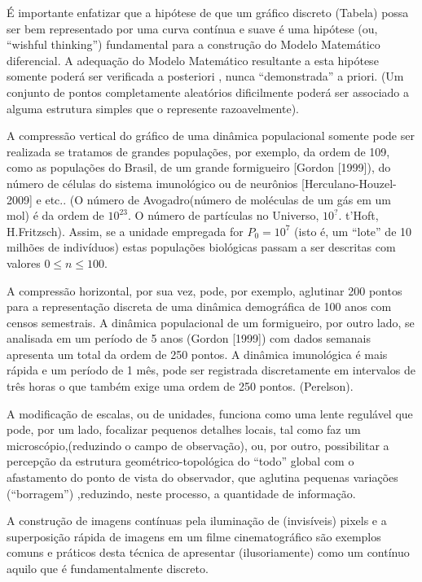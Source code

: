     É importante enfatizar que a hipótese de que um gráfico discreto (Tabela) possa ser bem representado por uma curva contínua e suave é uma hipótese (ou, ``wishful thinking'') fundamental para a construção do Modelo Matemático diferencial. A adequação do Modelo Matemático resultante a esta hipótese somente poderá ser verificada a posteriori , nunca ``demonstrada'' a priori. (Um conjunto de pontos completamente aleatórios dificilmente poderá ser associado a alguma estrutura simples que o represente razoavelmente).

    A compressão vertical do gráfico de uma dinâmica populacional somente pode ser realizada se tratamos de grandes populações, por exemplo, da ordem de 109, como as populações do Brasil, de um grande formigueiro [Gordon [1999]), do número de células do sistema imunológico ou de neurônios [Herculano-Houzel-2009] e etc.. (O número de Avogadro(número de moléculas de um gás em um mol) é da ordem de \(10^{23}\). O número de partículas no Universo, \(10^{?}\). t’Hoft, H.Fritzsch). Assim, se a unidade empregada for \(P_0 = 10^7\) (isto é, um ``lote'' de 10 milhões de indivíduos) estas populações biológicas passam a ser descritas com valores \(0 \le n \le 100\).

    A compressão horizontal, por sua vez, pode, por exemplo, aglutinar 200 pontos para a representação discreta de uma dinâmica demográfica de 100 anos com censos semestrais. A dinâmica populacional de um formigueiro, por outro lado, se analisada em um período de 5 anos (Gordon [1999]) com dados semanais apresenta um total da ordem de 250 pontos. A dinâmica imunológica é mais rápida e um período de 1 mês, pode ser registrada discretamente em intervalos de três horas o que também exige uma ordem de 250 pontos. (Perelson).

    A modificação de escalas, ou de unidades, funciona como uma lente regulável que pode, por um lado, focalizar pequenos detalhes locais, tal como faz um microscópio,(reduzindo o campo de observação), ou, por outro, possibilitar a percepção da estrutura geométrico-topológica do ``todo'' global com o afastamento do ponto de vista do observador, que aglutina pequenas variações (``borragem'') ,reduzindo, neste processo, a quantidade de informação.

    A construção de imagens contínuas pela iluminação de (invisíveis) pixels e a superposição rápida de imagens em um filme cinematográfico são exemplos comuns e práticos desta técnica de apresentar (ilusoriamente) como um contínuo aquilo que é fundamentalmente discreto.

